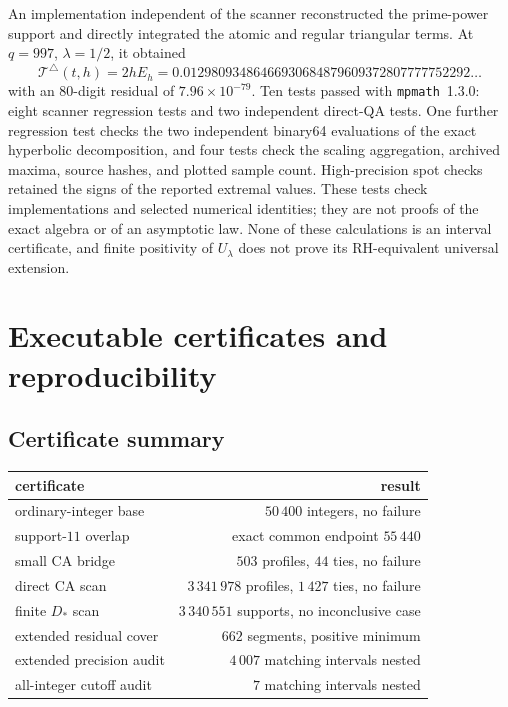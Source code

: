 \documentclass[11pt,a4paper]{article}
\numberwithin{equation}{section}
\theoremstyle{definition}
\begin{document}
An implementation independent of the scanner reconstructed the prime-power
support and directly integrated the atomic and regular triangular terms.  At
\(q=997\), \(\lambda=1/2\), it obtained
\[
  \mathcal T^\triangle(t,h)=2hE_h
  =0.01298093486466930684879609372807777752292\ldots
\]
with an 80-digit residual of \(7.96\times10^{-79}\).  Ten tests passed with
\texttt{mpmath}~1.3.0: eight scanner regression tests and two independent
direct-QA tests.  One further regression test checks the two independent
binary64 evaluations of the exact hyperbolic decomposition, and four tests
check the scaling aggregation, archived maxima, source hashes, and plotted
sample count.  High-precision spot checks retained the signs of the reported
extremal values.  These tests check implementations and selected numerical
identities; they are not proofs of the exact algebra or of an asymptotic
law.  None of these calculations is an interval certificate, and finite
positivity of \(U_\lambda\) does not prove its RH-equivalent universal
extension.

\section{Executable certificates and reproducibility}

\subsection{Certificate summary}

\begin{center}
\begin{tabular}{p{}r}
\toprule
certificate & result\\
\midrule
ordinary-integer base & \(50\,400\) integers, no failure\\
support-\(11\) overlap & exact common endpoint \(55\,440\)\\
small CA bridge & \(503\) profiles, \(44\) ties, no failure\\
direct CA scan & \(3\,341\,978\) profiles, \(1\,427\) ties, no failure\\
finite \(D_*\) scan & \(3\,340\,551\) supports, no inconclusive case\\
extended residual cover & \(662\) segments, positive minimum\\
extended precision audit & \(4\,007\) matching intervals nested\\
all-integer cutoff audit & \(7\) matching intervals nested\\
\bottomrule
\end{tabular}
\end{center}
\end{document}
